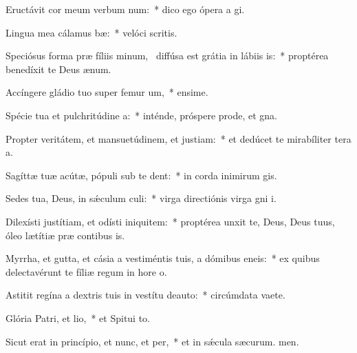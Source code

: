 \item Eructávit cor meum verbum num:~* dico ego ópera a gi.
\item Lingua mea cálamus bæ:~* velóci scritis.
\item Speciósus forma præ fíliis minum,~\pscross{} diffúsa est grátia in lábiis is:~* proptérea benedíxit te Deus  ænum.
\item Accíngere gládio tuo super femur um,~* ensime.
\item Spécie tua et pulchritúdine a:~* inténde, próspere prode, et gna.
\item Propter veritátem, et mansuetúdinem, et justiam:~* et dedúcet te mirabíliter tera a.
\item Sagíttæ tuæ acútæ, pópuli sub te dent:~* in corda inimirum gis.
\item Sedes tua, Deus, in sǽculum culi:~* virga directiónis virga gni i.
\item Dilexísti justítiam, et odísti iniquitem:~* proptérea unxit te, Deus, Deus tuus, óleo lætítiæ præ contibus is.
\item Myrrha, et gutta, et cásia a vestiméntis tuis, a dómibus eneis:~* ex quibus delectavérunt te fíliæ regum in hore o.
\item Astitit regína a dextris tuis in vestítu deauto:~* circúmdata vaete.
\item Glória Patri, et lio,~* et Spitui to.
\item Sicut erat in princípio, et nunc, et per,~* et in sǽcula sæcurum. men.
